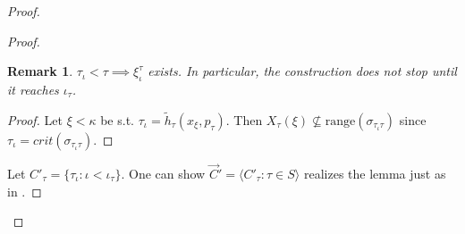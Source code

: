 \documentclass[12pt]{article}
\newtheorem{claim}[theorem]{Claim}
\newtheorem{remark}[theorem]{Remark}
\begin{document}
\begin{proof}
\begin{proof}
        \begin{remark}
            $\tau_\iota < \tau \implies \xi^\tau_\iota$ exists. In particular, the construction does not stop until it reaches $\iota_\tau$.
        \end{remark}
        \begin{proof}
            Let $\xi < \kappa$ be s.t. $\tau_\iota = \tilde{h}_\tau(x_\xi,p_\tau)$. Then $X_\tau(\xi) \nsubseteq \text{range}(\sigma_{\tau_\iota \tau})$ since $\tau_\iota = crit(\sigma_{\tau_\iota \tau})$.
        \end{proof}

        Let $C'_\tau = \{\tau_\iota :\iota < \iota_\tau\}$. One can show $\vec{C}' = \langle C'_\tau : \tau \in S\rangle$ realizes the lemma just as in \cite{zssquare}.

\end{proof}
\end{proof}
\end{document}
